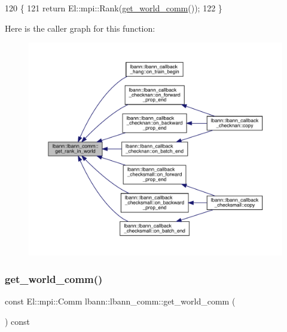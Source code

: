 \begin{DoxyCode}
120                                        \{
121     \textcolor{keywordflow}{return} El::mpi::Rank(\hyperlink{classlbann_1_1lbann__comm_a0493f1f0c42b95674daacf5288fdb073}{get\_world\_comm}());
122   \}
\end{DoxyCode}
Here is the caller graph for this function\+:\nopagebreak
\begin{figure}[H]
\begin{center}
\leavevmode
\includegraphics[width=350pt]{classlbann_1_1lbann__comm_a4519335d6772dab3c36517618260d48a_icgraph}
\end{center}
\end{figure}
\mbox{\label{classlbann_1_1lbann__comm_a0493f1f0c42b95674daacf5288fdb073}} 
\subsubsection{\texorpdfstring{get\+\_\+world\+\_\+comm()}{get\_world\_comm()}}
{\footnotesize\ttfamily const El\+::mpi\+::\+Comm lbann\+::lbann\+\_\+comm\+::get\+\_\+world\+\_\+comm (\begin{DoxyParamCaption}{ }\end{DoxyParamCaption}) const\hspace{0.3cm}{\ttfamily [inline]}}

